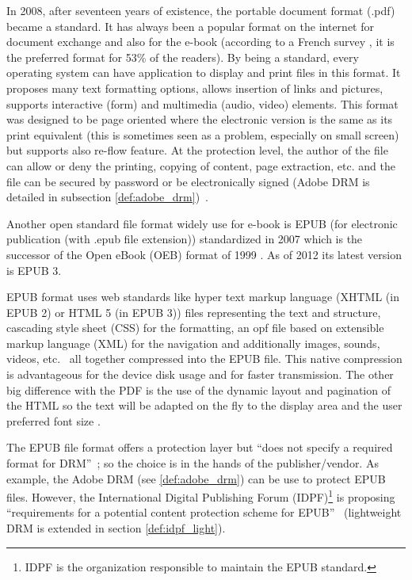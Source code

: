 \documentclass[11pt,a4paper,oneside]{memoir}
\begin{document}
\label{def:e-book:pdf}In 2008, after seventeen years of existence, the portable document format (.pdf) became a standard. It has always been a popular format on the internet for document exchange and also for the e-book (according to a French survey \cite[p. 19]{OpinionWay:baro_v1}, it is the preferred format for 53\% of the readers). By being a standard, every operating system can have application to display and print files in this format. It proposes many text formatting options, allows insertion of links and pictures, supports interactive (form) and multimedia (audio, video) elements. This format was designed to be page oriented where the electronic version is the same as its print equivalent (this is sometimes seen as a problem, especially on small screen) but supports also re-flow feature. At the protection level, the author of the file can allow or deny the printing, copying of content, page extraction, etc. and the file can be secured by password or be electronically signed (Adobe DRM is detailed in subsection \vref{def:adobe_drm})~\cite{adobe:pdf}.

\label{def:e-book:epub} Another open standard file format widely use for e-book is EPUB (for electronic publication (with .epub file extension)) standardized in 2007 which is the successor of the Open eBook (OEB) format of 1999 \cite{idpf:epub}. As of 2012 its latest version is EPUB 3.
 
EPUB format uses web standards like hyper text markup language (XHTML (in EPUB 2) or HTML 5 (in EPUB 3)) files representing the text and structure, cascading style sheet (CSS) for the formatting, an opf file based on extensible markup language (XML) for the navigation and additionally images, sounds, videos, etc. ~all together compressed into the EPUB file. 
This native compression is advantageous for the device disk usage and for faster transmission. 
The other big difference with the PDF is the use of the dynamic layout and pagination of the HTML so the text will be adapted on the fly to the display area and the user preferred font size \cite{idpf:epub3}. 

\label{def:e-book:epub-drm}The EPUB file format offers a protection layer but \textquotedblleft does not specify a required format for DRM\textquotedblright ~\cite[section 2.5.5]{idpf:ocf_spec}; so the choice is in the hands of the publisher/vendor. As example, the Adobe DRM (see \vref{def:adobe_drm}) can be use to protect EPUB files. However, the International Digital Publishing Forum (IDPF)\footnote{IDPF is the organization responsible to maintain the EPUB standard.} is proposing \textquotedblleft requirements for a potential content protection scheme for EPUB\textquotedblright ~\cite{idpf:drm-rfc} (lightweight DRM is extended in section \vref{def:idpf_light}).
\end{document}

